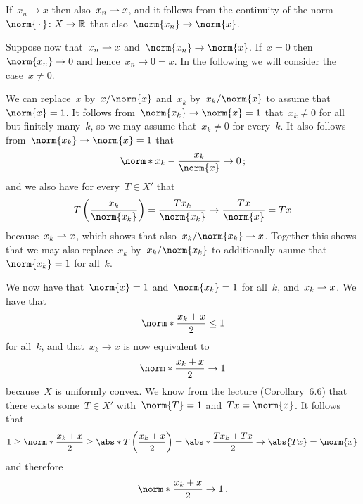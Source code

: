 \section{}

If~$x_n \to x$ then also~$x_n \rightharpoonup x$, and it follows from the continuity of the norm~$\norm{\,\cdot\,} \colon X \to \Real$ that also~$\norm{x_n} \to \norm{x}$.

Suppose now that~$x_n \rightharpoonup x$ and~$\norm{x_n} \to \norm{x}$.
If~$x = 0$ then~$\norm{x_n} \to 0$ and hence~$x_n \to 0 = x$.
In the following we will consider the case~$x \neq 0$.

We can replace~$x$ by~$x/\norm{x}$ and~$x_k$ by~$x_k/\norm{x}$ to assume that~$\norm{x} = 1$.
It follows from~$\norm{x_k} \to \norm{x} = 1$ that~$x_k \neq 0$ for all but finitely many~$k$, so we may assume that~$x_k \neq 0$ for every~$k$.
It also follows from~$\norm{x_k} \to \norm{x} = 1$ that
\[
  \norm*{ x_k - \frac{x_k}{\norm{x}} }
  \to
  0 \,;
\]
and we also have for every~$T \in X'$ that
\[
  T\left( \frac{x_k}{\norm{x_k}} \right)
  =
  \frac{T x_k}{\norm{x_k}}
  \to
  \frac{T x}{\norm{x}}
  =
  T x
\]
because~$x_k \rightharpoonup x$, which shows that also~$x_k/\norm{x_k} \wto x$.
Together this shows that we may also replace~$x_k$ by~$x_k/\norm{x_k}$ to additionally asume that~$\norm{x_k} = 1$ for all~$k$.

We now have that~$\norm{x} = 1$ and~$\norm{x_k} = 1$ for all~$k$, and~$x_k \rightharpoonup x$.
We have that
\[
  \norm*{ \frac{x_k + x}{2} }
  \leq
  1
\]
for all~$k$, and that~$x_k \to x$ is now equivalent to
\[
  \norm*{ \frac{x_k + x}{2} }
  \to
  1
\]
because~$X$ is uniformly convex.
We know from the lecture (Corollary~6.6) that there exists some~$T \in X'$ with~$\norm{T} = 1$ and~$Tx = \norm{x}$.
It follows that
\[
  1
  \geq
  \norm*{ \frac{x_k + x}{2} }
  \geq
  \abs*{ T\left( \frac{x_k + x}{2} \right) }
  =
  \abs*{ \frac{T x_k + T x}{2} }
  \to
  \abs{ Tx }
  =
  \norm{x} \,
\]
and therefore
\[
  \norm*{ \frac{x_k + x}{2} }
  \to
  1 \,.
\]




